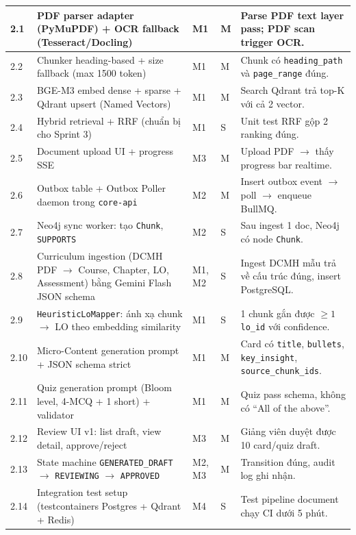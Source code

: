 \begin{longtable}{|p{0.7cm}|p{6.3cm}|p{1.2cm}|p{1cm}|p{3cm}|}
    2.1 & PDF parser adapter (PyMuPDF) + OCR fallback (Tesseract/Docling) & M1 & M & Parse PDF text layer pass; PDF scan trigger OCR. \\ \hline
    2.2 & Chunker heading-based + size fallback (max 1500 token) & M1 & M & Chunk có \texttt{heading\_path} và \texttt{page\_range} đúng. \\ \hline
    2.3 & BGE-M3 embed dense + sparse + Qdrant upsert (Named Vectors) & M1 & M & Search Qdrant trả top-K với cả 2 vector. \\ \hline
    2.4 & Hybrid retrieval + RRF (chuẩn bị cho Sprint 3) & M1 & S & Unit test RRF gộp 2 ranking đúng. \\ \hline
    2.5 & Document upload UI + progress SSE & M3 & M & Upload PDF $\to$ thấy progress bar realtime. \\ \hline
    2.6 & Outbox table + Outbox Poller daemon trong \texttt{core-api} & M2 & M & Insert outbox event $\to$ poll $\to$ enqueue BullMQ. \\ \hline
    2.7 & Neo4j sync worker: tạo \texttt{Chunk}, \texttt{SUPPORTS} & M2 & S & Sau ingest 1 doc, Neo4j có node \texttt{Chunk}. \\ \hline
    2.8 & Curriculum ingestion (DCMH PDF $\to$ Course, Chapter, LO, Assessment) bằng Gemini Flash JSON schema & M1, M2 & S & Ingest DCMH mẫu trả về cấu trúc đúng, insert PostgreSQL. \\ \hline
    2.9 & \texttt{HeuristicLoMapper}: ánh xạ chunk $\to$ LO theo embedding similarity & M1 & S & 1 chunk gắn được $\geq 1$ \texttt{lo\_id} với confidence. \\ \hline
    2.10 & Micro-Content generation prompt + JSON schema strict & M1 & M & Card có \texttt{title}, \texttt{bullets}, \texttt{key\_insight}, \texttt{source\_chunk\_ids}. \\ \hline
    2.11 & Quiz generation prompt (Bloom level, 4-MCQ + 1 short) + validator & M1 & M & Quiz pass schema, không có ``All of the above''. \\ \hline
    2.12 & Review UI v1: list draft, view detail, approve/reject & M3 & M & Giảng viên duyệt được 10 card/quiz draft. \\ \hline
    2.13 & State machine \texttt{GENERATED\_DRAFT} $\to$ \texttt{REVIEWING} $\to$ \texttt{APPROVED} & M2, M3 & M & Transition đúng, audit log ghi nhận. \\ \hline
    2.14 & Integration test setup (testcontainers Postgres + Qdrant + Redis) & M4 & S & Test pipeline document chạy CI dưới 5 phút. \\ \hline
\end{longtable}

